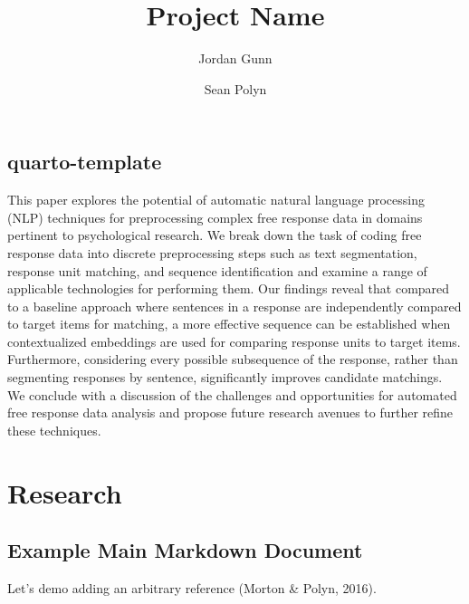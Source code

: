 \documentclass[
  letterpaper,
  DIV=11,
  numbers=noendperiod]{scrreprt}
\title{Project Name}
\author{Jordan Gunn \and Sean Polyn}
\date{}
\renewcommand*\contentsname{Table of contents}
\newcommand\contentsname{Table of contents}
\begin{document}
\maketitle
\ifdefined\Shaded\renewenvironment{Shaded}{\begin{tcolorbox}[sharp corners, frame hidden, boxrule=0pt, enhanced, interior hidden, borderline west={3pt}{0pt}{shadecolor}, breakable]}{\end{tcolorbox}}\fi

\renewcommand*\contentsname{Table of contents}
{
\hypersetup{linkcolor=}
\setcounter{tocdepth}{2}
\tableofcontents
}

\hypertarget{quarto-template}{%
\chapter{quarto-template}\label{quarto-template}}

This paper explores the potential of automatic natural language
processing (NLP) techniques for preprocessing complex free response data
in domains pertinent to psychological research. We break down the task
of coding free response data into discrete preprocessing steps such as
text segmentation, response unit matching, and sequence identification
and examine a range of applicable technologies for performing them. Our
findings reveal that compared to a baseline approach where sentences in
a response are independently compared to target items for matching, a
more effective sequence can be established when contextualized
embeddings are used for comparing response units to target items.
Furthermore, considering every possible subsequence of the response,
rather than segmenting responses by sentence, significantly improves
candidate matchings. We conclude with a discussion of the challenges and
opportunities for automated free response data analysis and propose
future research avenues to further refine these techniques.

\part{Research}

\hypertarget{example-main-markdown-document}{%
\chapter{Example Main Markdown
Document}\label{example-main-markdown-document}}

Let's demo adding an arbitrary reference (Morton \& Polyn, 2016).
\end{document}
